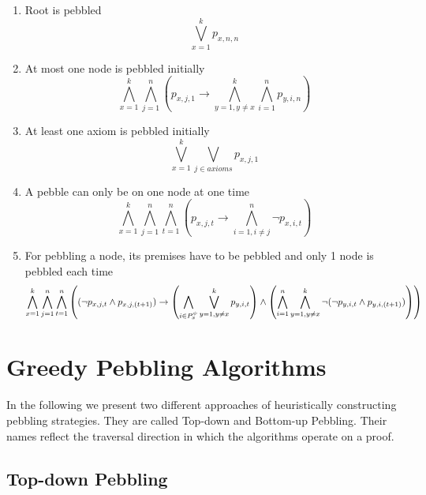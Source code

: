 \documentclass{llncs}
\begin{document}
\begin{enumerate}
	\item Root is pebbled
				$$\bigvee_{x = 1}^k p_{x,n,n}$$
				
	\item At most one node is pebbled initially\\
				$$\bigwedge_{x = 1}^k \bigwedge_{j = 1}^n \left( p_{x,j,1} \rightarrow \bigwedge_{y = 1, y \neq x}^k \bigwedge_{i = 1}^n p_{y,i,n} \right)$$
	
	\item At least one axiom is pebbled initially\\
				$$\bigvee_{x = 1}^k \bigvee_{j \in axioms} p_{x,j,1}$$
				
	\item A pebble can only be on one node at one time
				$$\bigwedge_{x = 1}^k \bigwedge_{j = 1}^n \bigwedge_{t = 1}^n \left( p_{x,j,t} \rightarrow \bigwedge_{i = 1, i \neq j}^n \neg p_{x,i,t} \right)$$ 
				
	\item For pebbling a node, its premises have to be pebbled and only 1 node is pebbled each time\\
				$$\bigwedge_{x = 1}^k \bigwedge_{j = 1}^n \bigwedge_{t = 1}^n \left( (\neg p_{x,j,t} \wedge p_{x,j,(t+1)} ) \rightarrow 
					\left( \bigwedge_{i \in P_{x}^{\psi}} \bigvee_{y = 1, y \neq x}^k p_{y,i,t} \right) \wedge 
					\left( \bigwedge_{i = 1}^n \bigwedge_{y = 1, y \neq x}^k \neg ( \neg p_{y,i,t} \wedge p_{y,i,(t+1)} ) \right) \right)$$
				
\end{enumerate}

\section{Greedy Pebbling Algorithms}

In the following we present two different approaches of heuristically constructing pebbling strategies.
They are called Top-down and Bottom-up Pebbling. Their names reflect the traversal direction in which the algorithms operate on a proof.

\subsection{Top-down Pebbling}
\end{document}
